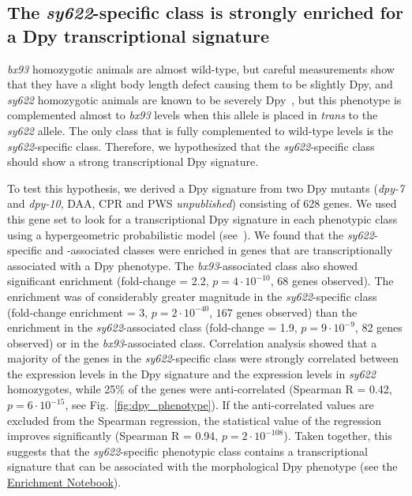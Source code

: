 \documentclass[10pt, twocolumn]{article}
\newcommand{\gene}[1]{\mbox{\emph{#1}}}
\begin{document}
\subsection*{The \emph{sy622}-specific class is strongly enriched for a Dpy
             transcriptional signature}
\emph{bx93} homozygotic animals are almost wild-type, but careful measurements
show that they have a slight body length defect causing them to be slightly Dpy,
and \emph{sy622} homozygotic animals are known to be severely
Dpy~\cite{Moghal2003}, but this phenotype is complemented almost to \emph{bx93}
levels when this allele is placed in \emph{trans} to the \emph{sy622} allele.
The only class that is fully complemented to wild-type levels is the
\emph{sy622}-specific class. Therefore, we hypothesized that the
\emph{sy622}-specific class should show a strong transcriptional Dpy signature.

To test this hypothesis, we derived a Dpy signature from two Dpy mutants
(\gene{dpy-7} and \gene{dpy-10}, DAA, CPR and PWS \emph{unpublished}) consisting
of 628 genes. We used this gene set to look for a transcriptional Dpy signature
in each phenotypic class using a hypergeometric probabilistic model
(see~). We found that the \emph{sy622}-specific and
-associated classes were enriched in genes that are transcriptionally associated
with a Dpy phenotype. The \emph{bx93}-associated class also showed significant
enrichment (fold-change = 2.2, $p=4\cdot10^{-10}$, 68 genes observed). The
enrichment was of considerably greater magnitude in the \emph{sy622}-specific
class (fold-change enrichment = 3, $p=2\cdot 10^{-40}$, $167$ genes observed)
than the enrichment in the \emph{sy622}-associated class (fold-change = 1.9,
$p=9\cdot10^{-9}$, 82 genes observed) or in the \emph{bx93}-associated class.
Correlation analysis showed that a majority of the genes in the
\emph{sy622}-specific class were strongly correlated between the expression
levels in the Dpy signature and the expression levels in \emph{sy622}
homozygotes, while 25\% of the genes were anti-correlated (Spearman R = 0.42,
$p=6\cdot10^{-15}$, see Fig.~\ref{fig:dpy_phenotype}). If the anti-correlated
values are excluded from the Spearman regression, the statistical value of the
regression improves significantly (Spearman R = 0.94, $p=2\cdot10^{-108}$).
Taken together, this suggests that the \emph{sy622}-specific phenotypic class
contains a transcriptional signature that can be associated with the
morphological Dpy phenotype
(see the
\href{https://wormlabcaltech.github.io/med-cafe/notebook/enrichment.html}{
Enrichment Notebook}).
\end{document}
